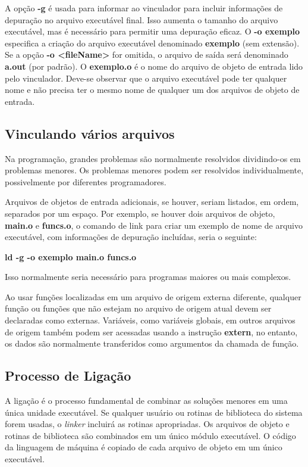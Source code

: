 A opção \textbf{-g} é usada para informar ao vinculador para incluir informações de depuração no arquivo executável final. Isso aumenta o tamanho do arquivo executável, mas é necessário para permitir uma depuração eficaz. O  \textbf{-o exemplo} especifica a criação do arquivo executável denominado \textbf{exemplo} (sem extensão). Se a opção \textbf{-o <fileName>} for omitida, o arquivo de saída será denominado \textbf{a.out} (por padrão). O \textbf{exemplo.o} é o nome do arquivo de objeto de entrada lido pelo vinculador. Deve-se observar que o arquivo executável pode ter qualquer nome e não precisa ter o mesmo nome de qualquer um dos arquivos de objeto de entrada.

\subsection{Vinculando vários arquivos}
Na programação, grandes problemas são normalmente resolvidos dividindo-os em problemas menores. Os problemas menores podem ser resolvidos individualmente, possivelmente por diferentes programadores.

Arquivos de objetos de entrada adicionais, se houver, seriam listados, em ordem, separados por um espaço. Por exemplo, se houver dois arquivos de objeto, \textbf{main.o} e \textbf{funcs.o}, o comando de link para criar um exemplo de nome de arquivo executável, com informações de depuração incluídas, seria o seguinte:
\begin{center}
	\textbf{ld -g -o exemplo main.o funcs.o}
\end{center}

Isso normalmente seria necessário para programas maiores ou mais complexos.

Ao usar funções localizadas em um arquivo de origem externa diferente, qualquer função ou funções que não estejam no arquivo de origem atual devem ser declaradas como externas. Variáveis, como variáveis globais, em outros arquivos de origem também podem ser acessadas usando a instrução \textbf{extern}, no entanto, os dados são normalmente transferidos como argumentos da chamada de função.

\subsection{Processo de Ligação}
A ligação é o processo fundamental de combinar as soluções menores em uma única unidade executável. Se qualquer usuário ou rotinas de biblioteca do sistema forem usadas, o \textit{linker} incluirá as rotinas apropriadas. Os arquivos de objeto e rotinas de biblioteca são combinados em um único módulo executável. O código da linguagem de máquina é copiado de cada arquivo de objeto em um único executável.

